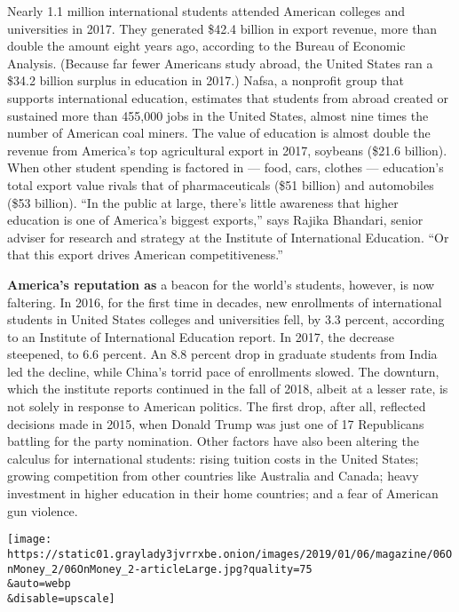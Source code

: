 Nearly 1.1 million international students attended American colleges and
universities in 2017. They generated \$42.4 billion in export revenue,
more than double the amount eight years ago, according to the Bureau of
Economic Analysis. (Because far fewer Americans study abroad, the United
States ran a \$34.2 billion surplus in education in 2017.) Nafsa, a
nonprofit group that supports international education, estimates that
students from abroad created or sustained more than 455,000 jobs in the
United States, almost nine times the number of American coal miners. The
value of education is almost double the revenue from America's top
agricultural export in 2017, soybeans (\$21.6 billion). When other
student spending is factored in --- food, cars, clothes --- education's
total export value rivals that of pharmaceuticals (\$51 billion) and
automobiles (\$53 billion). ``In the public at large, there's little
awareness that higher education is one of America's biggest exports,''
says Rajika Bhandari, senior adviser for research and strategy at the
Institute of International Education. ``Or that this export drives
American competitiveness.''

\textbf{America's reputation as} a beacon for the world's students,
however, is now faltering. In 2016, for the first time in decades, new
enrollments of international students in United States colleges and
universities fell, by 3.3 percent, according to an Institute of
International Education report. In 2017, the decrease steepened, to 6.6
percent. An 8.8 percent drop in graduate students from India led the
decline, while China's torrid pace of enrollments slowed. The downturn,
which the institute reports continued in the fall of 2018, albeit at a
lesser rate, is not solely in response to American politics. The first
drop, after all, reflected decisions made in 2015, when Donald Trump was
just one of 17 Republicans battling for the party nomination. Other
factors have also been altering the calculus for international students:
rising tuition costs in the United States; growing competition from
other countries like Australia and Canada; heavy investment in higher
education in their home countries; and a fear of American gun violence.

\texttt{[image: https://static01.graylady3jvrrxbe.onion/images/2019/01/06/magazine/06OnMoney\_2/06OnMoney\_2-articleLarge.jpg?quality=75\\\&auto=webp\\\&disable=upscale]}

